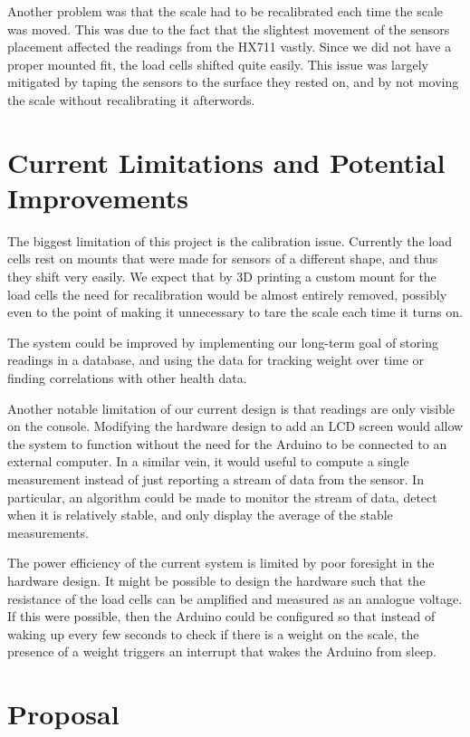 \documentclass[letterpaper,11pt]{article}
\begin{document}
Another problem was that the scale had to be recalibrated each time the scale
was moved. This was due to the fact that the slightest movement of the sensors
placement affected the readings from the HX711 vastly. Since we did not have a
proper mounted fit, the load cells shifted quite easily. This issue was largely
mitigated by taping the sensors to the surface they rested on, and by not moving
the scale without recalibrating it afterwords.

\section{Current Limitations and Potential Improvements}

The biggest limitation of this project is the calibration issue. Currently the
load cells rest on mounts that were made for sensors of a different shape, and
thus they shift very easily. We expect that by 3D printing a custom mount for
the load cells the need for recalibration would be almost entirely removed,
possibly even to the point of making it unnecessary to tare the scale each time
it turns on.

The system could be improved by implementing our long-term goal of storing
readings in a database, and using the data for tracking weight over time or
finding correlations with other health data.

Another notable limitation of our current design is that readings are only
visible on the console. Modifying the hardware design to add an LCD screen would
allow the system to function without the need for the Arduino to be connected to
an external computer. In a similar vein, it would useful to compute a single
measurement instead of just reporting a stream of data from the sensor. In
particular, an algorithm could be made to monitor the stream of data, detect
when it is relatively stable, and only display the average of the stable
measurements.

The power efficiency of the current system is limited by poor foresight in the
hardware design. It might be possible to design the hardware such that the
resistance of the load cells can be amplified and measured as an analogue
voltage. If this were possible, then the Arduino could be configured so that
instead of waking up every few seconds to check if there is a weight on the
scale, the presence of a weight triggers an interrupt that wakes the Arduino
from sleep.

\newpage
\appendix

\section{Proposal}
\end{document}
